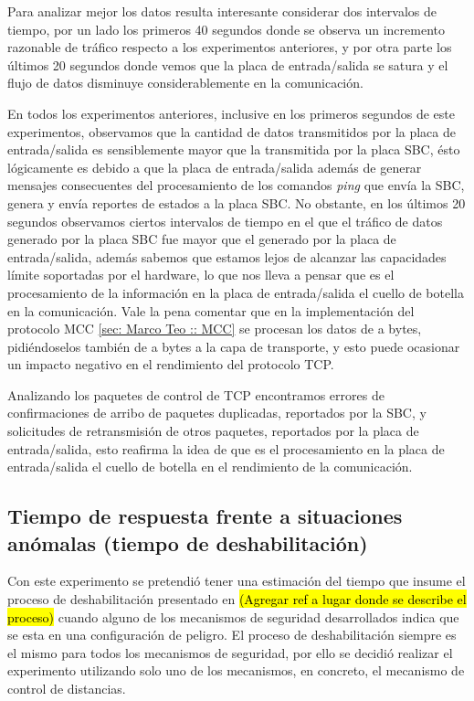 \documentclass[withindex,glossary]{cam-thesis}
\begin{document}
Para analizar mejor los datos resulta interesante considerar dos intervalos de tiempo, por un lado los primeros 40 segundos donde se observa un incremento razonable de tráfico respecto a los experimentos anteriores, y por otra parte los últimos 20 segundos donde vemos que  la placa de entrada/salida se satura y el flujo de datos disminuye considerablemente en la comunicación.

En todos los experimentos anteriores, inclusive en los primeros segundos de este experimentos, observamos que la cantidad de datos transmitidos por la placa de entrada/salida es sensiblemente mayor que la transmitida por la placa SBC, ésto lógicamente es debido a que la placa de entrada/salida además de generar mensajes consecuentes del procesamiento de los comandos \textit{ping} que envía la SBC, genera y envía reportes de estados a la placa SBC. 
No obstante, en los últimos 20 segundos observamos ciertos intervalos de tiempo en el que el tráfico de datos generado por la placa SBC fue mayor que el generado por la placa de entrada/salida, además sabemos que estamos lejos de alcanzar las capacidades límite soportadas por el hardware, lo que nos lleva a pensar que es el procesamiento de la información en la placa de entrada/salida el cuello de botella en la comunicación. Vale la pena comentar que en la implementación del protocolo MCC \ref{sec: Marco Teo :: MCC} se procesan los datos de a bytes, pidiéndoselos también de a bytes a la capa de transporte, y esto puede ocasionar un impacto negativo en el rendimiento del protocolo TCP.

Analizando los paquetes de control de TCP encontramos errores de confirmaciones de arribo de paquetes duplicadas, reportados por la SBC, y solicitudes de retransmisión de otros paquetes, reportados por la placa de entrada/salida, esto reafirma la idea de que es el procesamiento en la placa de entrada/salida el cuello de botella en el rendimiento de la comunicación.



\subsection{Tiempo de respuesta frente a situaciones anómalas (tiempo de deshabilitación)}
Con este experimento se pretendió tener una estimación del tiempo que insume el proceso de deshabilitación presentado en \hl{(Agregar ref a lugar donde se describe el proceso)} cuando alguno de los mecanismos de seguridad desarrollados indica que se esta en una configuración de peligro. El proceso de deshabilitación siempre es el mismo para todos los mecanismos de seguridad, por ello se decidió realizar el experimento utilizando solo uno de los mecanismos, en concreto, el mecanismo de control de distancias.
\end{document}

